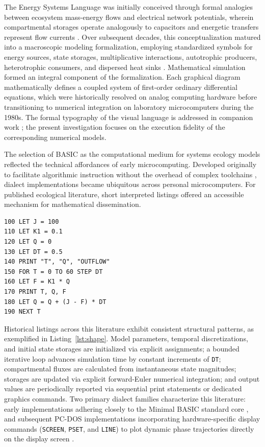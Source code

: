 \documentclass[3p,times,authoryear,twocolumn]{elsarticle}
\begin{document}
The Energy Systems Language was initially conceived through formal analogies between ecosystem mass-energy flows and electrical network potentials, wherein compartmental storages operate analogously to capacitors and energetic transfers represent flow currents \citep{odum1960}. Over subsequent decades, this conceptualization matured into a macroscopic modeling formalization, employing standardized symbols for energy sources, state storages, multiplicative interactions, autotrophic producers, heterotrophic consumers, and dispersed heat sinks \citep{odum1972,odum1983,odum1994}. Mathematical simulation formed an integral component of the formalization. Each graphical diagram mathematically defines a coupled system of first-order ordinary differential equations, which were historically resolved on analog computing hardware before transitioning to numerical integration on laboratory microcomputers during the 1980s. The formal typography of the visual language is addressed in companion work \citep{energese}; the present investigation focuses on the execution fidelity of the corresponding numerical models.

The selection of BASIC as the computational medium for systems ecology models reflected the technical affordances of early microcomputing. Developed originally to facilitate algorithmic instruction without the overhead of complex toolchains \citep{kemenyKurtz1964}, dialect implementations became ubiquitous across personal microcomputers. For published ecological literature, short interpreted listings offered an accessible mechanism for mathematical dissemination. 

\begin{lstlisting}[caption={Representative structural syntax of an ecological simulation listing, illustrating state initialization, forward-Euler numerical integration, and sequential state output.},label={lst:shape}]
100 LET J = 100
110 LET K1 = 0.1
120 LET Q = 0
130 LET DT = 0.5
140 PRINT "T", "Q", "OUTFLOW"
150 FOR T = 0 TO 60 STEP DT
160 LET F = K1 * Q
170 PRINT T, Q, F
180 LET Q = Q + (J - F) * DT
190 NEXT T
\end{lstlisting}

Historical listings across this literature exhibit consistent structural patterns, as exemplified in Listing~\ref{lst:shape}. Model parameters, temporal discretizations, and initial state storages are initialized via explicit assignments; a bounded iterative loop advances simulation time by constant increments of \texttt{DT}; compartmental fluxes are calculated from instantaneous state magnitudes; storages are updated via explicit forward-Euler numerical integration; and output values are periodically reported via sequential print statements or dedicated graphics commands. Two primary dialect families characterize this literature: early implementations adhering closely to the Minimal BASIC standard core \citep{ecma55}, and subsequent PC-DOS implementations incorporating hardware-specific display commands (\texttt{SCREEN}, \texttt{PSET}, and \texttt{LINE}) to plot dynamic phase trajectories directly on the display screen \citep{odum1989}.
\end{document}
